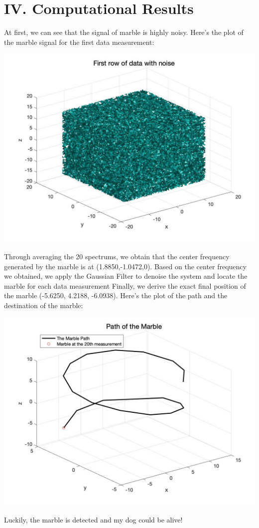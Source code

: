 \documentclass[12pt,letterpaper]{article}
\begin{document}
\section*{IV. Computational Results}
At first, we can see that the signal of marble is highly noisy. Here's the plot of the marble signal for the first data measurement:
\begin{center}
\includegraphics[height= 4 in]{1.jpg}
\end{center}
Through averaging the 20 spectrums, we obtain that the center frequency generated by the marble is at (1.8850,-1.0472,0). Based on the center frequency we obtained, we apply the Gaussian Filter to denoise the system and locate the marble for each data measurement
Finally, we derive the exact final position of the marble (-5.6250, 4.2188, -6.0938). Here's the plot of the path and the destination of the marble:
\begin{center}
\includegraphics[height= 4 in]{2.jpg}
\end{center}
Luckily, the marble is detected and my dog could be alive!
\end{document}
